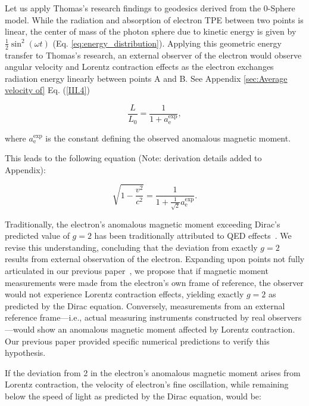 \documentclass[%
 reprint,
 amsmath,amssymb,
 aps,
]{revtex4-1}
\numberwithin{equation}{section}%
\begin{document}
Let us apply Thomas's research findings to geodesics derived from the 0-Sphere model. While the radiation and absorption of electron TPE between two points is linear, the center of mass of the photon sphere due to kinetic energy is given by $\frac{1}{2}\sin^2\left(\omega t\right)$ (Eq. \ref{eq:energy_distribution}). Applying this geometric energy transfer to Thomas's research, an external observer of the electron would observe angular velocity and Lorentz contraction effects as the electron exchanges radiation energy linearly between points A and B. See Appendix \ref{sec:Average velocity of} Eq. (\ref{III.4})

\begin{equation}
    \frac{L}{L_0} = \frac{1}{1 + a^{\text{exp}}_{\text{e}}},
    \label{III.4}
\end{equation}

\noindent where $a^{\text{exp}}_{\text{e}}$ is the constant defining the observed anomalous magnetic moment.

This leads to the following equation (Note: derivation details added to Appendix):

\begin{equation}
    \sqrt{1 - \frac{v^2}{c^2}} = \frac{1}{1 + \frac{1}{\sqrt{2}} a^{\text{exp}}_{\text{e}}}.
    \label{III.7}
\end{equation}

Traditionally, the electron's anomalous magnetic moment exceeding Dirac's predicted value of $g=2$ has been traditionally attributed to QED effects~\cite{kinoshita2010, schwinger1948}. We revise this understanding, concluding that the deviation from exactly $g=2$ results from external observation of the electron. Expanding upon points not fully articulated in our previous paper~\cite{hanamura2023}, we propose that if magnetic moment measurements were made from the electron's own frame of reference, the observer would not experience Lorentz contraction effects, yielding exactly $g=2$ as predicted by the Dirac equation. Conversely, measurements from an external reference frame—i.e., actual measuring instruments constructed by real observers—would show an anomalous magnetic moment affected by Lorentz contraction. Our previous paper provided specific numerical predictions to verify this hypothesis.

If the deviation from 2 in the electron's anomalous magnetic moment arises from Lorentz contraction, the velocity of electron's fine oscillation, while remaining below the speed of light as predicted by the Dirac equation, would be:
\end{document}
